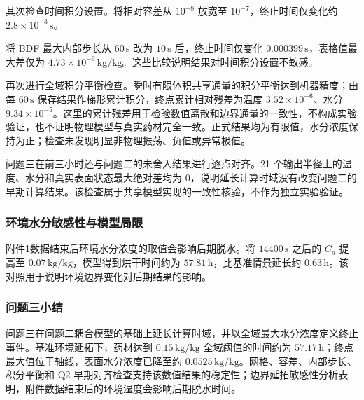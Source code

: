 其次检查时间积分设置。将相对容差从 $10^{-8}$ 放宽至 $10^{-7}$，终止时间仅变化约 $2.8\times10^{-3}\,\mathrm{s}$。

将 BDF 最大内部步长从 $60\,\mathrm{s}$ 改为 $10\,\mathrm{s}$ 后，终止时间仅变化 $0.000399\,\mathrm{s}$，表格值最大差仅为 $4.73\times10^{-9}\,\mathrm{kg/kg}$。这些比较说明结果对时间积分设置不敏感。

再次进行全域积分平衡检查。瞬时有限体积共享通量的积分平衡达到机器精度；由每 $60\,\mathrm{s}$ 保存结果作梯形累计积分，终点累计相对残差为温度 $3.52\times10^{-6}$、水分 $9.34\times10^{-5}$。这里的累计残差用于检验数值离散和边界通量的一致性，不构成实验验证，也不证明物理模型与真实药材完全一致。正式结果均为有限值，水分浓度保持为正；检查未发现明显非物理振荡、负值或异常极值。

问题三在前三小时还与问题二的未舍入结果进行逐点对齐。21 个输出半径上的温度、水分和真实表面状态最大绝对差均为 0，说明延长计算时域没有改变问题二的早期计算结果。该检查属于共享模型实现的一致性核验，不作为独立实验验证。

\subsubsection{环境水分敏感性与模型局限}

附件1数据结束后环境水分浓度的取值会影响后期脱水。将 $14400\,\mathrm{s}$ 之后的 $C_a$ 提高至 $0.07\,\mathrm{kg/kg}$，模型得到烘干时间约为 $57.81\,\mathrm{h}$，比基准情景延长约 $0.63\,\mathrm{h}$。该对照用于说明环境边界变化对后期结果的影响。

\subsubsection{问题三小结}

问题三在问题二耦合模型的基础上延长计算时域，并以全域最大水分浓度定义终止事件。基准环境延拓下，药材达到 $0.15\,\mathrm{kg/kg}$ 全域阈值的时间约为 $57.17\,\mathrm{h}$；终点最大值位于轴线，表面水分浓度已降至约 $0.0525\,\mathrm{kg/kg}$。网格、容差、内部步长、积分平衡和 Q2 早期对齐检查支持该数值结果的稳定性；边界延拓敏感性分析表明，附件数据结束后的环境湿度会影响后期脱水时间。
